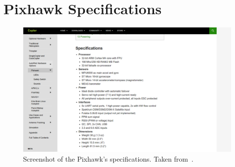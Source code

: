 \chapter{Pixhawk Specifications}

\begin{figure}
  \centering
  \includegraphics[width=\textwidth]{figures/appendices/pixhawk_specs_screenshot}
  \caption[Screenshot of the Pixhawk's specifications.]{Screenshot of the Pixhawk's specifications. Taken from~\cite{pixhawk-specs-pic}.}
\label{}
\end{figure}

\endinput
